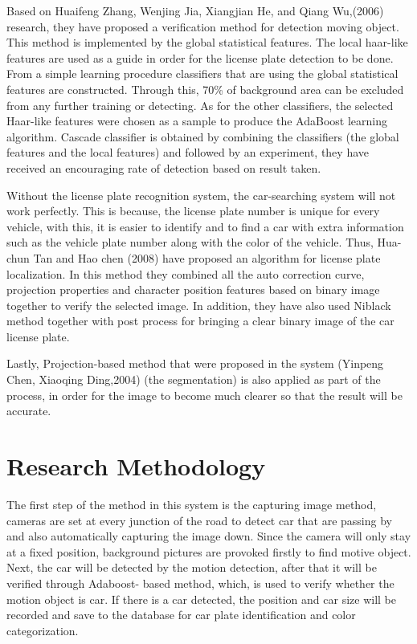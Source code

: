 \documentclass[12pt]{article}
\begin{document}
Based on Huaifeng Zhang, Wenjing Jia, Xiangjian He, and Qiang Wu,(2006) research, they have proposed a verification method for detection moving object. This method is implemented by the global statistical features. The local haar-like features are used as a guide in order for the license plate detection to be done. From a simple learning procedure classifiers that are using the global statistical features are constructed. Through this, 70\% of background area can be excluded from any further training or detecting. As for the other classifiers, the selected Haar-like features were chosen as a sample to produce the AdaBoost learning algorithm. Cascade classifier is obtained by combining the classifiers (the global features and the local features) and followed by an experiment, they have received an encouraging rate of detection based on result taken.\cite{adboost}
 
Without the license plate recognition system, the car-searching system will not work perfectly. This is because, the license plate number is unique for every vehicle, with this, it is easier to identify and to find a car with extra information such as the vehicle plate number along with the color of the vehicle. Thus, Hua-chun Tan and Hao chen (2008) have proposed an algorithm for license plate localization. In this method they combined all the auto correction curve, projection properties and character position features based on binary image together to verify the selected image. In addition, they have also used Niblack method together with post process for bringing a clear binary image of the car license plate.  \cite{acbm}

Lastly, Projection-based method that were proposed in the system (Yinpeng Chen, Xiaoqing Ding,2004) (the segmentation) is also applied as part of the process, in order for the image to become much clearer so that the result will be accurate. \cite{segment}




\section{Research Methodology}


The first step of the method in this system is the capturing image method, cameras are set at every junction of the road to detect car that are passing by and also automatically capturing the image down.
Since the camera will only stay at a fixed position, background pictures are provoked firstly to find motive object. Next, the car will be detected by the motion detection, after that it will be verified through Adaboost- based method, which, is used to verify whether the motion object is car.\cite{adboost} If there is a car detected, the position and car size will be recorded and save to the database for car plate identification and color categorization.
\end{document}
